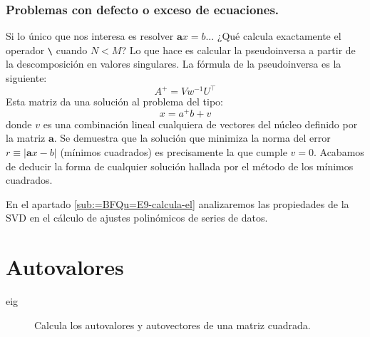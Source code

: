 \subsubsection{Problemas con defecto o exceso de ecuaciones.}

Si lo único que nos interesa es resolver $\mathbf{a}x=b$... ¿Qué
calcula exactamente el operador \texttt{\textbackslash{}} cuando $N<M$?
Lo que hace es calcular la pseudoinversa a partir de la descomposición
en valores singulares. La fórmula de la pseudoinversa es la siguiente:
$$A^{+}=Vw^{-1}U^{\top}$$
Esta matriz da una solución al problema del tipo:
$$x=a^{+}b+v$$
donde $v$ es una combinación lineal cualquiera de vectores del núcleo
definido por la matriz $\mathbf{a}$. Se demuestra que la solución
que minimiza la norma del error $r\equiv|\mathbf{a}x-b|$ (mínimos
cuadrados) es precisamente la que cumple $v=0$. Acabamos de deducir
la forma de cualquier solución hallada por el método de los mínimos
cuadrados.

En el apartado \ref{sub:=BFQu=E9-calcula-el} analizaremos las propiedades
de la SVD en el cálculo de ajustes polinómicos de series de datos.


\section{Autovalores}

\begin{description}
\item [eig]Calcula los autovalores y autovectores de una matriz
cuadrada.
\end{description}
